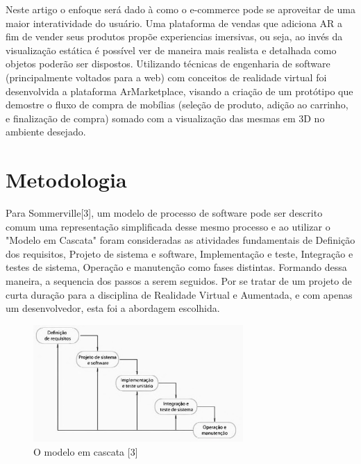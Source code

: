 \documentclass[conference]{IEEEtran}
\begin{document}
\par
Neste artigo o enfoque será dado à como o e-commerce pode se aproveitar de uma
maior interatividade do usuário. Uma plataforma de vendas que adiciona AR a fim
de vender seus produtos propõe experiencias imersivas, ou seja, ao invés da
visualização estática é possível ver de maneira mais realista e detalhada como
objetos poderão ser dispostos. Utilizando técnicas de engenharia de software
(principalmente voltados para a web) com conceitos de realidade virtual foi
desenvolvida a plataforma ArMarketplace, visando a criação de um protótipo que
demostre o fluxo de compra de mobílias (seleção de produto, adição ao carrinho,
e finalização de compra) somado com a visualização das mesmas em 3D no ambiente
desejado.

\section{Metodologia}
Para Sommerville[3], um modelo de processo de software pode ser descrito comum
uma representação simplificada desse mesmo processo e ao utilizar o "Modelo em
Cascata" foram consideradas as atividades fundamentais de Definição dos
requisitos, Projeto de sistema e software, Implementação e teste, Integração e
testes de sistema, Operação e manutenção como fases distintas. Formando dessa
maneira, a sequencia dos passos a serem seguidos. Por se tratar de um projeto
de curta duração para a disciplina de Realidade Virtual e Aumentada, e com
apenas um desenvolvedor, esta foi a abordagem escolhida.

\begin{figure}[h]
  \caption{O modelo em cascata [3]}

  \centering %
  \includegraphics[width=8cm]{assets/modelo_cascata.png}
\end{figure}
\end{document}
